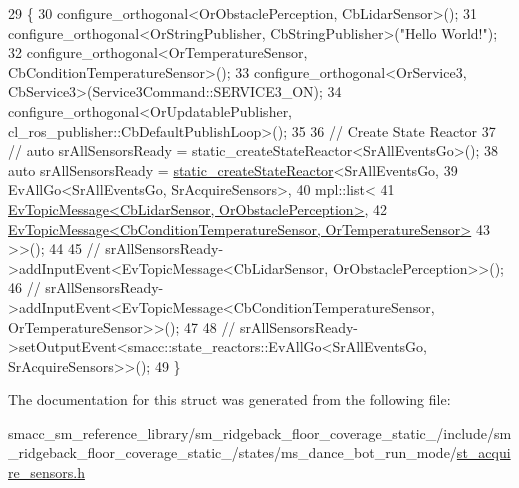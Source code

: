 \begin{DoxyCode}
29    \{
30       configure\_orthogonal<OrObstaclePerception, CbLidarSensor>();
31       configure\_orthogonal<OrStringPublisher, CbStringPublisher>(\textcolor{stringliteral}{"Hello World!"});
32       configure\_orthogonal<OrTemperatureSensor, CbConditionTemperatureSensor>();
33       configure\_orthogonal<OrService3, CbService3>(Service3Command::SERVICE3\_ON);
34       configure\_orthogonal<OrUpdatablePublisher, cl\_ros\_publisher::CbDefaultPublishLoop>();
35 
36       \textcolor{comment}{// Create State Reactor}
37       \textcolor{comment}{// auto srAllSensorsReady = static\_createStateReactor<SrAllEventsGo>();}
38       \textcolor{keyword}{auto} srAllSensorsReady = \hyperlink{classsmacc_1_1SmaccState_a892be704b48f93bf5c35635d1a58ed54}{static\_createStateReactor}<SrAllEventsGo,
39                                                    EvAllGo<SrAllEventsGo, SrAcquireSensors>,
40                                                    mpl::list<
41                                                                
      \hyperlink{structsmacc_1_1default__events_1_1EvTopicMessage}{EvTopicMessage<CbLidarSensor, OrObstaclePerception>},
42                                                                
      \hyperlink{structsmacc_1_1default__events_1_1EvTopicMessage}{EvTopicMessage<CbConditionTemperatureSensor, OrTemperatureSensor>}
43                                                             >>();
44                                                             
45       \textcolor{comment}{// srAllSensorsReady->addInputEvent<EvTopicMessage<CbLidarSensor, OrObstaclePerception>>();}
46       \textcolor{comment}{// srAllSensorsReady->addInputEvent<EvTopicMessage<CbConditionTemperatureSensor,
       OrTemperatureSensor>>();}
47 
48       \textcolor{comment}{// srAllSensorsReady->setOutputEvent<smacc::state\_reactors::EvAllGo<SrAllEventsGo,
       SrAcquireSensors>>();}
49    \}
\end{DoxyCode}


The documentation for this struct was generated from the following file\+:\begin{DoxyCompactItemize}
\item 
smacc\+\_\+sm\+\_\+reference\+\_\+library/sm\+\_\+ridgeback\+\_\+floor\+\_\+coverage\+\_\+static\+\_/include/sm\+\_\+ridgeback\+\_\+floor\+\_\+coverage\+\_\+static\+\_/states/ms\+\_\+dance\+\_\+bot\+\_\+run\+\_\+mode/\hyperlink{sm__ridgeback__floor__coverage__static__1_2include_2sm__ridgeback__floor__coverage__static__1_2s8d631c3395ca0f2dfea7f5ba27795308}{st\+\_\+acquire\+\_\+sensors.\+h}\end{DoxyCompactItemize}

